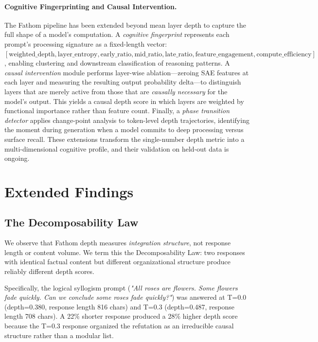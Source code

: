 \documentclass[10pt]{article}
\begin{document}
\paragraph{Cognitive Fingerprinting and Causal Intervention.}
The Fathom pipeline has been extended beyond mean layer depth to capture the full shape of a model's computation. A \emph{cognitive fingerprint} represents each prompt's processing signature as a fixed-length vector: $[\text{weighted\_depth}, \text{layer\_entropy}, \text{early\_ratio}, \text{mid\_ratio}, \text{late\_ratio}, \text{feature\_engagement}, \text{compute\_efficiency}]$, enabling clustering and downstream classification of reasoning patterns. A \emph{causal intervention} module performs layer-wise ablation---zeroing SAE features at each layer and measuring the resulting output probability delta---to distinguish layers that are merely active from those that are \emph{causally necessary} for the model's output. This yields a causal depth score in which layers are weighted by functional importance rather than feature count. Finally, a \emph{phase transition detector} applies change-point analysis to token-level depth trajectories, identifying the moment during generation when a model commits to deep processing versus surface recall. These extensions transform the single-number depth metric into a multi-dimensional cognitive profile, and their validation on held-out data is ongoing.

\section{Extended Findings}

\subsection{The Decomposability Law}
\label{sec:decomposability}

We observe that Fathom depth measures \emph{integration structure}, not response length or content volume. We term this the Decomposability Law: two responses with identical factual content but different organizational structure produce reliably different depth scores.

Specifically, the logical syllogism prompt (\emph{"All roses are flowers. Some flowers fade quickly. Can we conclude some roses fade quickly?"}) was answered at T=0.0 (depth=0.380, response length 816 chars) and T=0.3 (depth=0.487, response length 708 chars). A 22\% shorter response produced a 28\% higher depth score because the T=0.3 response organized the refutation as an irreducible causal structure rather than a modular list.
\end{document}
